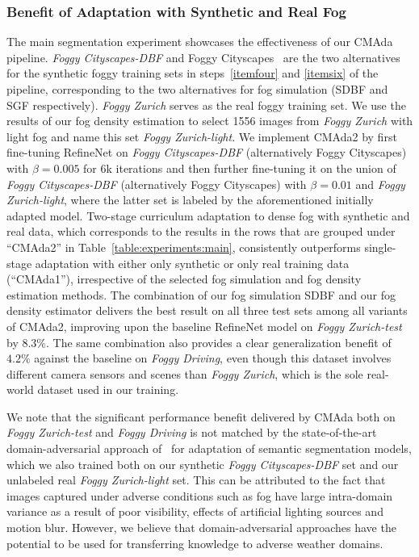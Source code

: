 \documentclass[twocolumn]{svjour3}          \smartqed  \usepackage{graphicx}
\begin{document}
\subsubsection{Benefit of Adaptation with Synthetic and Real Fog}
\label{sec:experiments:curriculum}





The main segmentation experiment showcases the effectiveness of our CMAda pipeline. \emph{Foggy Cityscapes-DBF} and Foggy Cityscapes~\cite{SFSU_synthetic} are the two alternatives for the synthetic foggy training sets in steps~\ref{itemfour} and \ref{itemsix} of the pipeline, corresponding to the two alternatives for fog simulation (SDBF and SGF respectively). \emph{Foggy Zurich} serves as the real foggy training set. We use the results of our fog density estimation to select 1556 images from \emph{Foggy Zurich} with light fog and name this set \emph{Foggy Zurich-light}. We implement CMAda2 by first fine-tuning RefineNet on \emph{Foggy Cityscapes-DBF} (alternatively Foggy Cityscapes) with $\beta=0.005$ for 6k iterations and then further fine-tuning it on the union of \emph{Foggy Cityscapes-DBF} (alternatively Foggy Cityscapes) with $\beta=0.01$ and \emph{Foggy Zurich-light}, where the latter set is labeled by the aforementioned initially adapted model. Two-stage curriculum adaptation to dense fog with synthetic and real data, which corresponds to the results in the rows that are grouped under ``CMAda2'' in Table~\ref{table:experiments:main}, consistently outperforms single-stage adaptation with either only synthetic or only real training data (``CMAda1''), irrespective of the selected fog simulation and fog density estimation methods. The combination of our fog simulation SDBF and our fog density estimator delivers the best result on all three test sets among all variants of CMAda2, improving upon the baseline RefineNet model on \emph{Foggy Zurich-test} by $8.3\%$. The same combination also provides a clear generalization benefit of $4.2\%$ against the baseline on \emph{Foggy Driving}, even though this dataset involves different camera sensors and scenes than \emph{Foggy Zurich}, which is the sole real-world dataset used in our training. 

We note that the significant performance benefit delivered by CMAda both on \emph{Foggy Zurich-test} and \emph{Foggy Driving} is not matched by the state-of-the-art domain-adversarial approach of~\cite{AdaptSegNet} for adaptation of semantic segmentation models, which we also trained both on our synthetic \emph{Foggy Cityscapes-DBF} set and our unlabeled real \emph{Foggy Zurich-light} set. This can be attributed to the fact that images captured under adverse conditions such as fog have large intra-domain variance as a result of poor visibility, effects of artificial lighting sources and motion blur. However, we believe that domain-adversarial approaches have the potential to be used for transferring knowledge to adverse weather domains.
\end{document}
